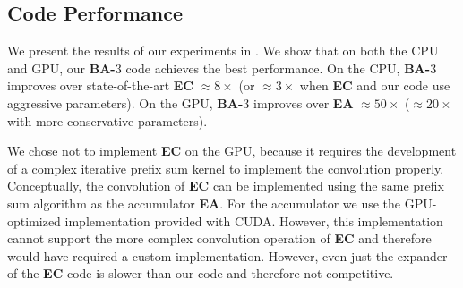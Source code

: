 
\subsection{Code Performance} \label{sec:eval_code}

We present the results of our experiments in . We show that on both the CPU and GPU, our \textbf{BA-$3$} code achieves the best performance. On the CPU, \textbf{BA-$3$} improves over state-of-the-art \textbf{EC} \cite{EC} $\approx8\times$ (or $\approx3\times$ when \textbf{EC} and our code use aggressive parameters). On the GPU, \textbf{BA-$3$} improves over \textbf{EA} $\approx50\times$ ($\approx20\times$ with more conservative parameters). 

\if\submission
We chose not to implement \textbf{EC} on the GPU, because it requires the development of a complex iterative prefix sum kernel to implement the convolution properly. Conceptually, the convolution of \textbf{EC} can be implemented using the same prefix sum algorithm as the accumulator \textbf{EA}. For the accumulator we use the GPU-optimized implementation provided with CUDA. However, this implementation cannot support the more complex convolution operation of \textbf{EC} and therefore would have required a custom implementation. However, even just the expander of the \textbf{EC} code is slower than our code and therefore not competitive. 
\fi




